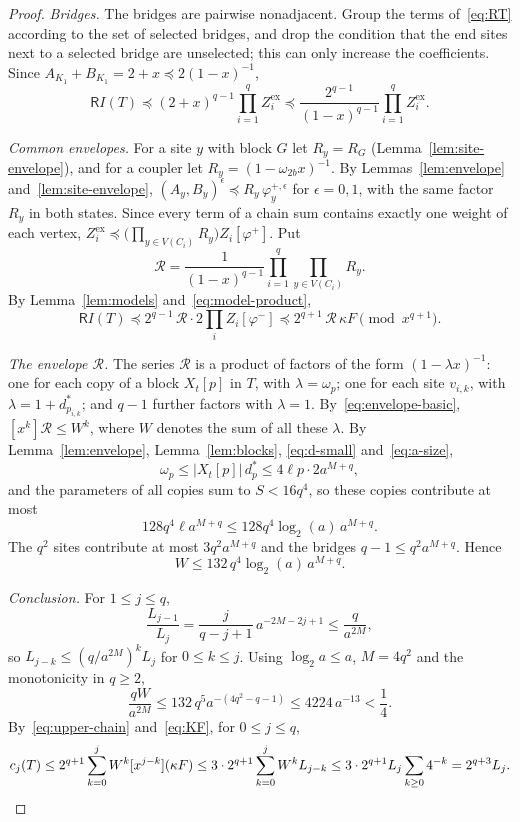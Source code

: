 \documentclass[11pt]{amsart}
\theoremstyle{definition}
\theoremstyle{remark}
\numberwithin{equation}{section}
\newcommand{\R}{\mathsf{R}}
\newcommand{\coef}[2]{[x^{#1}]#2}
\begin{document}
\begin{proof}
\emph{Bridges.} The bridges are pairwise nonadjacent. Group the terms of~\eqref{eq:RT} according to the set of selected bridges, and drop the condition that the end sites next to a selected bridge are unselected; this can only increase the coefficients. Since $A_{K_1}+B_{K_1}=2+x\preceq2(1-x)^{-1}$,
\[
\R I(T)\preceq(2+x)^{q-1}\prod_{i=1}^qZ_i^{\mathrm{ex}}\preceq\frac{2^{q-1}}{(1-x)^{q-1}}\prod_{i=1}^qZ_i^{\mathrm{ex}}.
\]

\emph{Common envelopes.} For a site $y$ with block $G$ let $R_y=R_G$ (Lemma~\ref{lem:site-envelope}), and for a coupler let $R_y=(1-\omega_{2b}x)^{-1}$. By Lemmas~\ref{lem:envelope} and~\ref{lem:site-envelope}, $(A_y,B_y)^\epsilon\preceq R_y\,\varphi^{+,\epsilon}_y$ for $\epsilon=0,1$, with the same factor $R_y$ in both states. Since every term of a chain sum contains exactly one weight of each vertex, $Z_i^{\mathrm{ex}}\preceq\bigl(\prod_{y\in V(C_i)}R_y\bigr)Z_i[\varphi^+]$. Put
\[
\mathcal R=\frac1{(1-x)^{q-1}}\prod_{i=1}^q\prod_{y\in V(C_i)}R_y.
\]
By Lemma~\ref{lem:models} and~\eqref{eq:model-product},
\begin{equation}\label{eq:upper-chain}
\R I(T)\preceq2^{q-1}\,\mathcal R\cdot2\prod_iZ_i[\varphi^-]\preceq2^{q+1}\,\mathcal R\,\kappa F\pmod{x^{q+1}}.
\end{equation}

\emph{The envelope $\mathcal R$.} The series $\mathcal R$ is a product of factors of the form $(1-\lambda x)^{-1}$: one for each copy of a block $X_t[p]$ in $T$, with $\lambda=\omega_p$; one for each site $v_{i,k}$, with $\lambda=1+d^\ast_{p_{i,k}}$; and $q-1$ further factors with $\lambda=1$. By~\eqref{eq:envelope-basic}, $\coef k{\mathcal R}\le W^k$, where $W$ denotes the sum of all these $\lambda$. By Lemma~\ref{lem:envelope}, Lemma~\ref{lem:blocks}, \eqref{eq:d-small} and~\eqref{eq:a-size},
\[
\omega_p\le|X_t[p]|\,d^\ast_p\le4\ell p\cdot2a^{M+q},
\]
and the parameters of all copies sum to $S<16q^4$, so these copies contribute at most
\[
128q^4\ell a^{M+q}\le128q^4\log_2(a)\,a^{M+q}.
\]
The $q^2$ sites contribute at most $3q^2a^{M+q}$ and the bridges $q-1\le q^2a^{M+q}$. Hence
\[
W\le132\,q^4\log_2(a)\,a^{M+q}.
\]

\emph{Conclusion.} For $1\le j\le q$,
\[
\frac{L_{j-1}}{L_j}=\frac{j}{q-j+1}\,a^{-2M-2j+1}\le\frac q{a^{2M}},
\]
so $L_{j-k}\le(q/a^{2M})^kL_j$ for $0\le k\le j$. Using $\log_2a\le a$, $M=4q^2$ and the monotonicity in $q\ge2$,
\[
\frac{qW}{a^{2M}}\le132\,q^5a^{-(4q^2-q-1)}\le4224\,a^{-13}<\frac14.
\]
By~\eqref{eq:upper-chain} and~\eqref{eq:KF}, for $0\le j\le q$,
\[
c_j(T)\le2^{q+1}\sum_{k=0}^jW^k\coef{j-k}{(\kappa F)}\le3\cdot2^{q+1}\sum_{k=0}^jW^kL_{j-k}\le3\cdot2^{q+1}L_j\sum_{k\ge0}4^{-k}=2^{q+3}L_j.\qedhere
\]
\end{proof}
\end{document}
